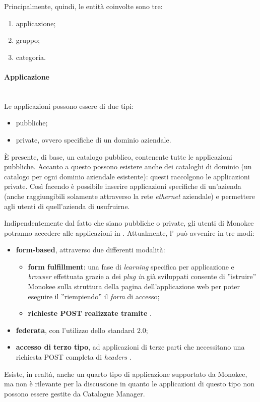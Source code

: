 Principalmente, quindi, le entità coinvolte sono tre:
\begin{enumerate}
	\item applicazione;
	\item gruppo;
	\item categoria.
\end{enumerate}

\paragraph{Applicazione} \mbox{} \\
Le applicazioni possono essere di due tipi:
\begin{itemize}
\item pubbliche;
\item private, ovvero specifiche di un dominio aziendale.
\end{itemize}
È presente, di base, un catalogo pubblico, contenente tutte le applicazioni pubbliche. Accanto a questo possono esistere anche dei cataloghi di dominio (un catalogo per ogni dominio aziendale esistente): questi raccolgono le applicazioni private. Così facendo è possibile inserire applicazioni specifiche di un'azienda (anche raggiungibili solamente attraverso la rete \textit{ethernet} aziendale) e permettere agli utenti di quell'azienda di usufruirne. 

Indipendentemente dal fatto che siano pubbliche o private, gli utenti di Monokee potranno accedere alle applicazioni in . Attualmente, l' può avvenire in tre modi:
\begin{itemize}
\item \textbf{form-based}, attraverso due differenti modalità:
\begin{itemize}
	\item \textbf{form fulfillment}: una fase di \textit{learning} specifica per applicazione e \textit{browser} effettuata grazie a dei \textit{plug in} già sviluppati consente di ''istruire'' Monokee sulla struttura della pagina dell'applicazione web per poter eseguire il  ''riempiendo'' il \textit{form} di accesso;
	\item \textbf{richieste POST realizzate tramite }.
\end{itemize}
\item \textbf{federata}, con l'utilizzo dello standard  2.0;
\item \textbf{accesso di terzo tipo}, ad applicazioni di terze parti che necessitano una richiesta POST  completa di \textit{headers} .
\end{itemize}
Esiste, in realtà, anche un quarto tipo di applicazione supportato da Monokee, ma non è rilevante per la discussione in quanto le applicazioni di questo tipo non possono essere gestite da Catalogue Manager.

